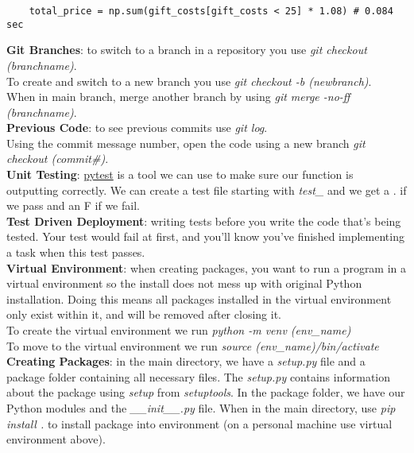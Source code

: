 \documentclass[11pt, a4paper]{article}
\begin{document}
\begin{spacing}{1.1}
\begin{lstlisting}
	total_price = np.sum(gift_costs[gift_costs < 25] * 1.08) # 0.084 sec
	\end{lstlisting} \vspace*{2mm}
	\textbf{Git Branches}: to switch to a branch in a repository you use \textit{git checkout (branchname)}.\\
	To create and switch to a new branch you use \textit{git checkout -b (newbranch)}.\\
	When in main branch, merge another branch by using \textit{git merge -no-ff (branchname)}.\vspace*{2mm}\\
	\textbf{Previous Code}: to see previous commits use \textit{git log}.\\
	Using the commit message number, open the code using a new branch \textit{git checkout (commit\#)}.\vspace*{2mm}\\
	\textbf{Unit Testing}: \href{https://docs.pytest.org/en/latest/getting-started.html}{pytest} is a tool we can use to make sure our function is outputting correctly. We can create a test file starting with \textit{test\_} and we get a . if we pass and an F if we fail.\vspace*{2mm}\\
	\textbf{Test Driven Deployment}: writing tests before you write the code that’s being tested. Your test would fail at first, and you’ll know you’ve finished implementing a task when this test passes.\vspace*{2mm}\\
	\textbf{Virtual Environment}: when creating packages, you want to run a program in a virtual environment so the install does not mess up with original Python installation. Doing this means all packages installed in the virtual environment only exist within it, and will be removed after closing it. \\
	To create the virtual environment we run \textit{python -m venv (env\_name)} \\
	To move to the virtual environment we run \textit{source (env\_name)/bin/activate}\vspace*{2mm}\\
	\textbf{Creating Packages}: in the main directory, we have a \textit{setup.py} file and a package folder containing all necessary files. The \textit{setup.py} contains information about the package using \textit{setup} from \textit{setuptools}. In the package folder, we have our Python modules and the \textit{\_\_init\_\_.py} file. When in the main directory, use \textit{pip install .} to install package into environment (on a personal machine use virtual environment above).\\

\end{spacing}
\end{document}
